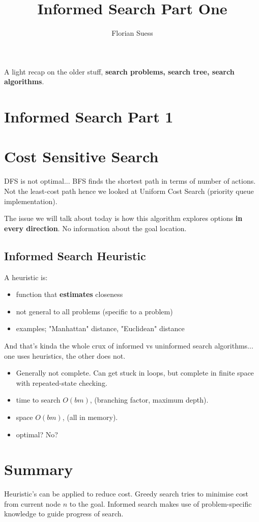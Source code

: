 \documentclass{article}
\begin{document}
\title{Informed Search Part One}
\date{}
\author{Florian Suess}
\maketitle

A light recap on the older stuff, \textbf{search problems, search tree, search algorithms}.

\section{Informed Search Part 1}
\section{Cost Sensitive Search}
DFS is not optimal... BFS finds the shortest path in terms of number of actions. Not the least-cost path hence we looked at Uniform Cost Search (priority queue implementation).

The issue we will talk about today is how this algorithm explores options \textbf{in every direction}. No information about the goal location.

\subsection{Informed Search Heuristic}
A heuristic is:

\begin{itemize}
	\item function that \textbf{estimates} closeness
	\item not general to all problems (specific to a problem)
	\item examples; "Manhattan" distance, "Euclidean" distance
\end{itemize}

And that's kinda the whole crux of informed vs uninformed search algorithms... one uses heuristics, the other does not.

\begin{itemize}
	\item Generally not complete. Can get stuck in loops, but complete in finite space with repeated-state checking.
	\item time to search $O(bm)$, (branching factor, maximum depth).
	\item space $O(bm)$, (all in memory).
	\item optimal? No?
\end{itemize}

\section{Summary}
Heuristic's can be applied to reduce cost. Greedy search tries to minimise cost from current node $n$ to the goal. Informed search makes use of problem-specific knowledge to guide progress of search.
\end{document}
